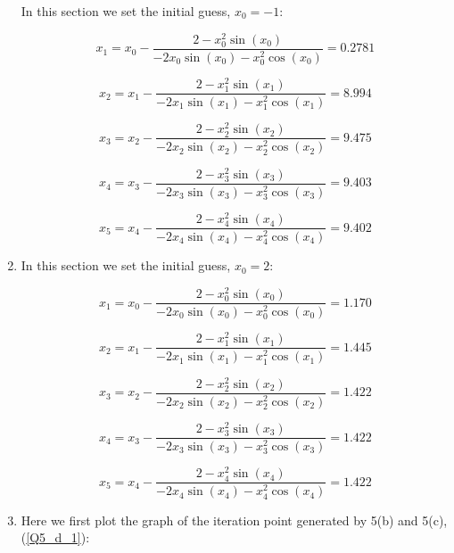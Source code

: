 \begin{solution}
\begin{enumerate}[label=(\alph*)]
	
In this section we set the initial guess, $x_0=-1$:



$$
x_{1} =x_{0}-\frac{2-x_0^2\sin (x_0)}{-2x_0 \sin(x_0) - x_0^2 \cos(x_0)}=0.2781
$$ 

$$
x_{2} =x_{1}-\frac{2-x_1^2\sin (x_1)}{-2x_1 \sin(x_1) - x_1^2 \cos(x_1)}=8.994
$$ 


$$
x_{3} =x_{2}-\frac{2-x_2^2\sin (x_2)}{-2x_2 \sin(x_2) - x_2^2 \cos(x_2)}=9.475
$$ 

$$
x_{4} =x_{3}-\frac{2-x_3^2\sin (x_3)}{-2x_3 \sin(x_3) - x_3^2 \cos(x_3)}=9.403
$$ 

$$
x_{5} =x_{4}-\frac{2-x_4^2\sin (x_4)}{-2x_4 \sin(x_4) - x_4^2 \cos(x_4)}=9.402
$$ 


\item

In this section we set the initial guess, $x_0=2$:

$$
x_{1} =x_{0}-\frac{2-x_0^2\sin (x_0)}{-2x_0 \sin(x_0) - x_0^2 \cos(x_0)}=1.170
$$ 

$$
x_{2} =x_{1}-\frac{2-x_1^2\sin (x_1)}{-2x_1 \sin(x_1) - x_1^2 \cos(x_1)}=1.445
$$ 


$$
x_{3} =x_{2}-\frac{2-x_2^2\sin (x_2)}{-2x_2 \sin(x_2) - x_2^2 \cos(x_2)}=1.422
$$ 

$$
x_{4} =x_{3}-\frac{2-x_3^2\sin (x_3)}{-2x_3 \sin(x_3) - x_3^2 \cos(x_3)}=1.422
$$ 

$$
x_{5} =x_{4}-\frac{2-x_4^2\sin (x_4)}{-2x_4 \sin(x_4) - x_4^2 \cos(x_4)}=1.422
$$ 


\item




Here we first plot the graph of the iteration point generated by 5(b) and 5(c), (\ref{Q5_d_1}):


\end{enumerate}
\end{solution}
